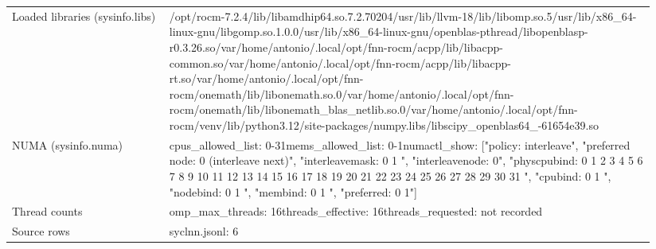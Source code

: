 \begin{longtable}{>{\raggedright\arraybackslash}p{0.23\linewidth}>{\raggedright\arraybackslash}p{0.71\linewidth}}
Loaded libraries (sysinfo.libs) & /\allowbreak{}opt/\allowbreak{}rocm-7.2.4/\allowbreak{}lib/\allowbreak{}libamdhip64.so.7.2.70204\newline /\allowbreak{}usr/\allowbreak{}lib/\allowbreak{}llvm-18/\allowbreak{}lib/\allowbreak{}libomp.so.5\newline /\allowbreak{}usr/\allowbreak{}lib/\allowbreak{}x86\_\allowbreak{}64-linux-gnu/\allowbreak{}libgomp.so.1.0.0\newline /\allowbreak{}usr/\allowbreak{}lib/\allowbreak{}x86\_\allowbreak{}64-linux-gnu/\allowbreak{}openblas-pthread/\allowbreak{}libopenblasp-r0.3.26.so\newline /\allowbreak{}var/\allowbreak{}home/\allowbreak{}antonio/\allowbreak{}.local/\allowbreak{}opt/\allowbreak{}fnn-rocm/\allowbreak{}acpp/\allowbreak{}lib/\allowbreak{}libacpp-common.so\newline /\allowbreak{}var/\allowbreak{}home/\allowbreak{}antonio/\allowbreak{}.local/\allowbreak{}opt/\allowbreak{}fnn-rocm/\allowbreak{}acpp/\allowbreak{}lib/\allowbreak{}libacpp-rt.so\newline /\allowbreak{}var/\allowbreak{}home/\allowbreak{}antonio/\allowbreak{}.local/\allowbreak{}opt/\allowbreak{}fnn-rocm/\allowbreak{}onemath/\allowbreak{}lib/\allowbreak{}libonemath.so.0\newline /\allowbreak{}var/\allowbreak{}home/\allowbreak{}antonio/\allowbreak{}.local/\allowbreak{}opt/\allowbreak{}fnn-rocm/\allowbreak{}onemath/\allowbreak{}lib/\allowbreak{}libonemath\_\allowbreak{}blas\_\allowbreak{}netlib.so.0\newline /\allowbreak{}var/\allowbreak{}home/\allowbreak{}antonio/\allowbreak{}.local/\allowbreak{}opt/\allowbreak{}fnn-rocm/\allowbreak{}venv/\allowbreak{}lib/\allowbreak{}python3.12/\allowbreak{}site-packages/\allowbreak{}numpy.libs/\allowbreak{}libscipy\_\allowbreak{}openblas64\_\allowbreak{}-61654e39.so \\
NUMA (sysinfo.numa) & cpus\_\allowbreak{}allowed\_\allowbreak{}list: 0-31\newline mems\_\allowbreak{}allowed\_\allowbreak{}list: 0-1\newline numactl\_\allowbreak{}show: ["policy: interleave", "preferred node: 0 (interleave next)", "interleavemask: 0 1 ", "interleavenode: 0", "physcpubind: 0 1 2 3 4 5 6 7 8 9 10 11 12 13 14 15 16 17 18 19 20 21 22 23 24 25 26 27 28 29 30 31 ", "cpubind: 0 1 ", "nodebind: 0 1 ", "membind: 0 1 ", "preferred: 0 1"] \\
Thread counts & omp\_\allowbreak{}max\_\allowbreak{}threads: 16\newline threads\_\allowbreak{}effective: 16\newline threads\_\allowbreak{}requested: not recorded \\
Source rows & syclnn.jsonl: 6 \\
\end{longtable}
